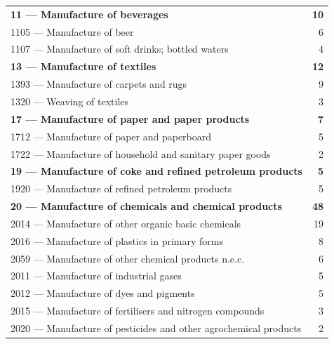 \begin{longtable}{lr}
\addlinespace[2pt]\textbf{11 --- Manufacture of beverages} & \textbf{10} \\
\hspace{1em}1105 --- Manufacture of beer & 6 \\
\hspace{1em}1107 --- Manufacture of soft drinks; bottled waters & 4 \\
\addlinespace[2pt]\textbf{13 --- Manufacture of textiles} & \textbf{12} \\
\hspace{1em}1393 --- Manufacture of carpets and rugs & 9 \\
\hspace{1em}1320 --- Weaving of textiles & 3 \\
\addlinespace[2pt]\textbf{17 --- Manufacture of paper and paper products} & \textbf{7} \\
\hspace{1em}1712 --- Manufacture of paper and paperboard & 5 \\
\hspace{1em}1722 --- Manufacture of household and sanitary paper goods & 2 \\
\addlinespace[2pt]\textbf{19 --- Manufacture of coke and refined petroleum products} & \textbf{5} \\
\hspace{1em}1920 --- Manufacture of refined petroleum products & 5 \\
\addlinespace[2pt]\textbf{20 --- Manufacture of chemicals and chemical products} & \textbf{48} \\
\hspace{1em}2014 --- Manufacture of other organic basic chemicals & 19 \\
\hspace{1em}2016 --- Manufacture of plastics in primary forms & 8 \\
\hspace{1em}2059 --- Manufacture of other chemical products n.e.c. & 6 \\
\hspace{1em}2011 --- Manufacture of industrial gases & 5 \\
\hspace{1em}2012 --- Manufacture of dyes and pigments & 5 \\
\hspace{1em}2015 --- Manufacture of fertilisers and nitrogen compounds & 3 \\
\hspace{1em}2020 --- Manufacture of pesticides and other agrochemical products & 2 \\

\end{longtable}
